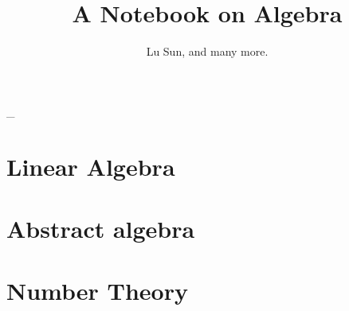 


\makeindex



\frontmatter

\title{A Notebook on Algebra}
\author{Lu Sun, and many more.}

\maketitle


\tableofcontents


\listoffigures
\listoftables

\mainmatter\_

\part{Linear Algebra}

\part{Abstract algebra}



\part{Number Theory}




\printindex


